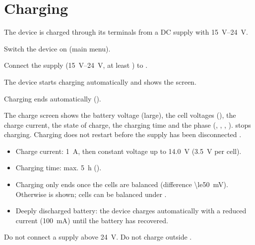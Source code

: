 \section{Charging}
\label{sec:charging}

The device is charged through its terminals from a DC supply with \qtyrange{15}{24}{\volt}.

\begin{steps}
    \item Switch the device on (main menu).
    \item Connect the supply (\qtyrange{15}{24}{\volt}, at least ) to .
    \item The device starts charging automatically and shows the  screen.
    \item Charging ends automatically ().
\end{steps}

The charge screen shows the battery voltage (large), the cell voltages (),
the charge current, the state of charge, the charging time and the phase
(, , , ).
 stops charging. Charging does not restart before the supply has been disconnected
.

\begin{itemize}
    \item Charge current: \qty{1}{\ampere}, then constant voltage up to \qty{14.0}{\volt} (\qty{3.5}{\volt} per cell).
    \item Charging time: max. \qty{5}{\hour} ().
    \item Charging only ends once the cells are balanced (difference \qty{\le50}{\milli\volt}).
          Otherwise  is shown; cells can be balanced under
          .
    \item Deeply discharged battery: the device charges automatically with a reduced current
          (\qty{100}{\milli\ampere}) until the battery has recovered.
\end{itemize}

\begin{caution}
    Do not connect a supply above \qty{24}{\volt}. Do not charge outside .
\end{caution}
